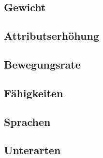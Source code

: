 \subsection*{Gewicht}
\subsection*{Attributserhöhung}
\subsection*{Bewegungsrate}
\subsection*{Fähigkeiten}
\subsection*{Sprachen}
\subsection*{Unterarten}

